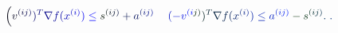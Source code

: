 \documentclass[12pt]{article}
\begin{document}
\makeatletter
\renewcommand*{\@textcolor}[3]{%
  \protect\leavevmode
  \begingroup
    \color#1{#2}#3%
  \endgroup
}
\makeatother
\begin{displaymath}
\begin{array} {rlr} \displaystyle & \displaystyle { { } \mathcolor[RGB]{0,0,15}{\left(} \mathcolor[RGB]{0,0,30}{v} ^ { \mathcolor[RGB]{0,0,45}{(} \mathcolor[RGB]{0,0,60}{i} \mathcolor[RGB]{0,0,75}{j} \mathcolor[RGB]{0,0,90}{)} } \mathcolor[RGB]{0,0,105}{)} ^ { \mathcolor[RGB]{0,0,120}{T} } \mathcolor[RGB]{0,0,135}{\nabla} \mathcolor[RGB]{0,0,150}{f} \mathcolor[RGB]{0,0,165}{(} \mathcolor[RGB]{0,0,180}{x} ^ { \mathcolor[RGB]{0,0,195}{(} \mathcolor[RGB]{0,0,210}{i} \mathcolor[RGB]{0,0,225}{)} } \mathcolor[RGB]{0,0,240}{)} \mathcolor[RGB]{0,0,255}{\leq} \mathcolor[RGB]{0,15,0}{s} ^ { \mathcolor[RGB]{0,15,15}{(} \mathcolor[RGB]{0,15,30}{i} \mathcolor[RGB]{0,15,45}{j} \mathcolor[RGB]{0,15,60}{)} } \mathcolor[RGB]{0,15,75}{+} \mathcolor[RGB]{0,15,90}{a} ^ { \mathcolor[RGB]{0,15,105}{(} \mathcolor[RGB]{0,15,120}{i} \mathcolor[RGB]{0,15,135}{j} \mathcolor[RGB]{0,15,150}{)} } \mathcolor[RGB]{0,15,165}{\right.} } & \displaystyle { \mathcolor[RGB]{0,15,180}{\left.} \mathcolor[RGB]{0,15,195}{(} \mathcolor[RGB]{0,15,210}{-} \mathcolor[RGB]{0,15,225}{v} ^ { \mathcolor[RGB]{0,15,240}{(} \mathcolor[RGB]{0,15,255}{i} \mathcolor[RGB]{0,30,0}{j} \mathcolor[RGB]{0,30,15}{)} } \mathcolor[RGB]{0,30,30}{)} ^ { \mathcolor[RGB]{0,30,45}{T} } \mathcolor[RGB]{0,30,60}{\nabla} \mathcolor[RGB]{0,30,75}{f} \mathcolor[RGB]{0,30,90}{(} \mathcolor[RGB]{0,30,105}{x} ^ { \mathcolor[RGB]{0,30,120}{(} \mathcolor[RGB]{0,30,135}{i} \mathcolor[RGB]{0,30,150}{)} } \mathcolor[RGB]{0,30,165}{)} \mathcolor[RGB]{0,30,180}{\leq} \mathcolor[RGB]{0,30,195}{a} ^ { \mathcolor[RGB]{0,30,210}{(} \mathcolor[RGB]{0,30,225}{i} \mathcolor[RGB]{0,30,240}{j} \mathcolor[RGB]{0,30,255}{)} } \mathcolor[RGB]{0,45,0}{-} \mathcolor[RGB]{0,45,15}{s} ^ { \mathcolor[RGB]{0,45,30}{(} \mathcolor[RGB]{0,45,45}{i} \mathcolor[RGB]{0,45,60}{j} \mathcolor[RGB]{0,45,75}{)} } \mathcolor[RGB]{0,45,90}{.} \mathcolor[RGB]{0,45,105}{\right.} \mathcolor[RGB]{0,45,120}{.} } \end{array}
\end{displaymath}
\end{document}
